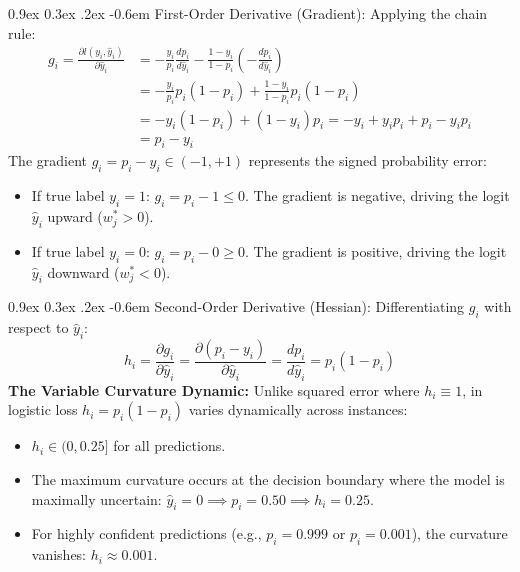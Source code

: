 \documentclass[11pt,a4paper]{article}
\makeatletter
\renewcommand\paragraph{\@startsection{paragraph}{4}{\z@}%
                                     {0.9ex \@plus0.3ex \@minus.2ex}%
                                     {-0.6em}%
                                     {\normalfont\normalsize\bfseries}}
\makeatother
\begin{document}
\paragraph{First-Order Derivative (Gradient):}
Applying the chain rule:
\begin{align}
    g_i = \frac{\partial l(y_i, \hat{y}_i)}{\partial \hat{y}_i} &= -\frac{y_i}{p_i} \frac{d p_i}{d \hat{y}_i} - \frac{1 - y_i}{1 - p_i} \left( -\frac{d p_i}{d \hat{y}_i} \right) \nonumber \\
    &= -\frac{y_i}{p_i} p_i(1 - p_i) + \frac{1 - y_i}{1 - p_i} p_i(1 - p_i) \nonumber \\
    &= -y_i(1 - p_i) + (1 - y_i)p_i = -y_i + y_i p_i + p_i - y_i p_i \nonumber \\
    &= p_i - y_i
\end{align}
The gradient $g_i = p_i - y_i \in (-1, +1)$ represents the signed probability error:
\begin{itemize}
    \item If true label $y_i = 1$: $g_i = p_i - 1 \le 0$. The gradient is negative, driving the logit $\hat{y}_i$ upward ($w_j^* > 0$).
    \item If true label $y_i = 0$: $g_i = p_i - 0 \ge 0$. The gradient is positive, driving the logit $\hat{y}_i$ downward ($w_j^* < 0$).
\end{itemize}

\paragraph{Second-Order Derivative (Hessian):}
Differentiating $g_i$ with respect to $\hat{y}_i$:
\begin{equation}
    h_i = \frac{\partial g_i}{\partial \hat{y}_i} = \frac{\partial (p_i - y_i)}{\partial \hat{y}_i} = \frac{d p_i}{d \hat{y}_i} = p_i (1 - p_i)
\end{equation}
\textbf{The Variable Curvature Dynamic:} Unlike squared error where $h_i \equiv 1$, in logistic loss $h_i = p_i(1 - p_i)$ varies dynamically across instances:
\begin{itemize}
    \item $h_i \in (0, 0.25]$ for all predictions.
    \item The maximum curvature occurs at the decision boundary where the model is maximally uncertain: $\hat{y}_i = 0 \implies p_i = 0.50 \implies h_i = 0.25$.
    \item For highly confident predictions (e.g., $p_i = 0.999$ or $p_i = 0.001$), the curvature vanishes: $h_i \approx 0.001$.
\end{itemize}
\end{document}
